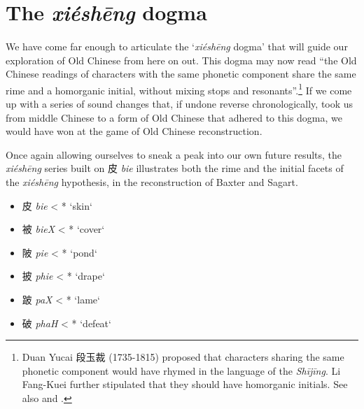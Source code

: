 \section{The \textit{xiéshēng} dogma}
\paragraph{} We have come far enough to articulate the `\textit{xiéshēng} dogma' that will guide our exploration of Old Chinese from here on out. This dogma may now read ``the Old Chinese readings of characters with the same phonetic component share the same rime and a homorganic initial, without mixing stops and resonants''.\footnote{Duan Yucai 段玉裁 (1735-1815) proposed that characters sharing the same phonetic component would have rhymed in the language of the \textit{Shījīng}. Li Fang-Kuei 
\citeyearpar[228]{Li1974} further stipulated that they should have homorganic initials. 
See also \citet[348]{Baxter1992} and \citet[11]{schuessler_minimal_2009}.}
If we come up with a series of sound changes that, if undone reverse chronologically, took us from middle Chinese to a form of Old Chinese that adhered to this dogma, we would have won at the game of Old Chinese reconstruction. 

Once again allowing ourselves to sneak a peak into our own future results, the \emph{xiéshēng} series built on 皮  \emph{bie} %
illustrates
both the rime and the initial facets of the \emph{xiéshēng} hypothesis, in the reconstruction of Baxter and Sagart.

\begin{itemize}
\item {\Large{皮}} \textit{bie} < *{} `skin`
\item {\Large{被}} 
\textit{bieX} < *{} `cover`
\item {\Large{陂}}  \textit{pie}  < *{} `pond`
\item {\Large{披}} \textit{phie} < *{} `drape`
\item {\Large{跛}} \textit{paX} < *{} `lame`
\item {\Large{破}} \textit{phaH} < *{} `defeat`
\end{itemize}

